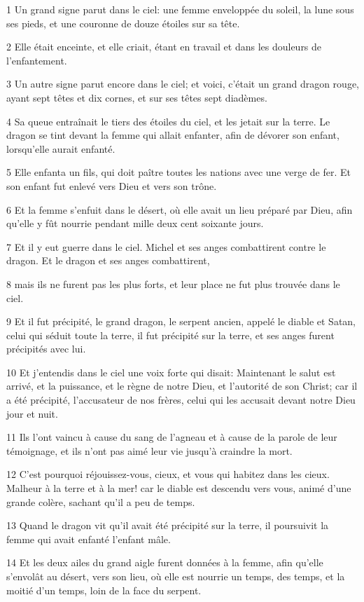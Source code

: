 \par 1 Un grand signe parut dans le ciel: une femme enveloppée du soleil, la lune sous ses pieds, et une couronne de douze étoiles sur sa tête.
\par 2 Elle était enceinte, et elle criait, étant en travail et dans les douleurs de l'enfantement.
\par 3 Un autre signe parut encore dans le ciel; et voici, c'était un grand dragon rouge, ayant sept têtes et dix cornes, et sur ses têtes sept diadèmes.
\par 4 Sa queue entraînait le tiers des étoiles du ciel, et les jetait sur la terre. Le dragon se tint devant la femme qui allait enfanter, afin de dévorer son enfant, lorsqu'elle aurait enfanté.
\par 5 Elle enfanta un fils, qui doit paître toutes les nations avec une verge de fer. Et son enfant fut enlevé vers Dieu et vers son trône.
\par 6 Et la femme s'enfuit dans le désert, où elle avait un lieu préparé par Dieu, afin qu'elle y fût nourrie pendant mille deux cent soixante jours.
\par 7 Et il y eut guerre dans le ciel. Michel et ses anges combattirent contre le dragon. Et le dragon et ses anges combattirent,
\par 8 mais ils ne furent pas les plus forts, et leur place ne fut plus trouvée dans le ciel.
\par 9 Et il fut précipité, le grand dragon, le serpent ancien, appelé le diable et Satan, celui qui séduit toute la terre, il fut précipité sur la terre, et ses anges furent précipités avec lui.
\par 10 Et j'entendis dans le ciel une voix forte qui disait: Maintenant le salut est arrivé, et la puissance, et le règne de notre Dieu, et l'autorité de son Christ; car il a été précipité, l'accusateur de nos frères, celui qui les accusait devant notre Dieu jour et nuit.
\par 11 Ils l'ont vaincu à cause du sang de l'agneau et à cause de la parole de leur témoignage, et ils n'ont pas aimé leur vie jusqu'à craindre la mort.
\par 12 C'est pourquoi réjouissez-vous, cieux, et vous qui habitez dans les cieux. Malheur à la terre et à la mer! car le diable est descendu vers vous, animé d'une grande colère, sachant qu'il a peu de temps.
\par 13 Quand le dragon vit qu'il avait été précipité sur la terre, il poursuivit la femme qui avait enfanté l'enfant mâle.
\par 14 Et les deux ailes du grand aigle furent données à la femme, afin qu'elle s'envolât au désert, vers son lieu, où elle est nourrie un temps, des temps, et la moitié d'un temps, loin de la face du serpent.
